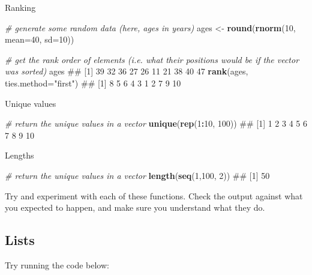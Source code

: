 \documentclass[]{article}
\newenvironment{Shaded}{\begin{snugshade}}{\end{snugshade}}
\newcommand{\KeywordTok}[1]{\textcolor[rgb]{0.13,0.29,0.53}{\textbf{#1}}}
\newcommand{\DataTypeTok}[1]{\textcolor[rgb]{0.13,0.29,0.53}{#1}}
\newcommand{\DecValTok}[1]{\textcolor[rgb]{0.00,0.00,0.81}{#1}}
\newcommand{\StringTok}[1]{\textcolor[rgb]{0.31,0.60,0.02}{#1}}
\newcommand{\CommentTok}[1]{\textcolor[rgb]{0.56,0.35,0.01}{\textit{#1}}}
\newcommand{\OperatorTok}[1]{\textcolor[rgb]{0.81,0.36,0.00}{\textbf{#1}}}
\newcommand{\NormalTok}[1]{#1}
\theoremstyle{definition}
\theoremstyle{definition}
\theoremstyle{definition}
\theoremstyle{remark}
\begin{document}
Ranking

\begin{Shaded}
\begin{Highlighting}[]
\CommentTok{# generate some random data (here, ages in years)}
\NormalTok{ages <-}\StringTok{ }\KeywordTok{round}\NormalTok{(}\KeywordTok{rnorm}\NormalTok{(}\DecValTok{10}\NormalTok{, }\DataTypeTok{mean=}\DecValTok{40}\NormalTok{, }\DataTypeTok{sd=}\DecValTok{10}\NormalTok{))}

\CommentTok{# get the rank order of elements (i.e. what their positions would be if the vector was sorted)}
\NormalTok{ages}
\NormalTok{##  [1] 39 32 36 27 26 11 21 38 40 47}
\KeywordTok{rank}\NormalTok{(ages, }\DataTypeTok{ties.method=}\StringTok{"first"}\NormalTok{)}
\NormalTok{##  [1]  8  5  6  4  3  1  2  7  9 10}
\end{Highlighting}
\end{Shaded}

Unique values

\begin{Shaded}
\begin{Highlighting}[]
\CommentTok{# return the unique values in a vector}
\KeywordTok{unique}\NormalTok{(}\KeywordTok{rep}\NormalTok{(}\DecValTok{1}\OperatorTok{:}\DecValTok{10}\NormalTok{, }\DecValTok{100}\NormalTok{))}
\NormalTok{##  [1]  1  2  3  4  5  6  7  8  9 10}
\end{Highlighting}
\end{Shaded}

Lengths

\begin{Shaded}
\begin{Highlighting}[]
\CommentTok{# return the unique values in a vector}
\KeywordTok{length}\NormalTok{(}\KeywordTok{seq}\NormalTok{(}\DecValTok{1}\NormalTok{,}\DecValTok{100}\NormalTok{, }\DecValTok{2}\NormalTok{))}
\NormalTok{## [1] 50}
\end{Highlighting}
\end{Shaded}

Try and experiment with each of these functions. Check the output
against what you expected to happen, and make sure you understand what
they do.

\hypertarget{lists}{\subsection*{Lists}\label{lists}}

Try running the code below:
\end{document}
